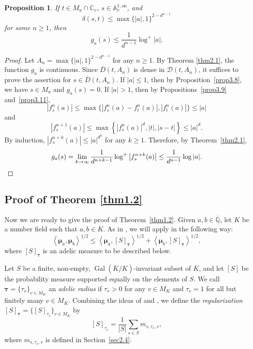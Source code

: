 \documentclass[10pt,a4paper]{amsart}
\numberwithin{equation}{section}
\theoremstyle{plain}
\newtheorem{prop}[thm]{Proposition}
\theoremstyle{definition}
\theoremstyle{remark}
\DeclareMathOperator{\Gal}{Gal}
\newcommand{\A}{\mathbb A}
\newcommand{\C}{\mathbb C}
\newcommand{\Q}{\mathbb Q}
\newcommand{\an}{\mathrm{an}}
\renewcommand{\bar}{\overline}
\begin{document}
\begin{prop}
\label{prop3.12}If $t\in M_{a}\cap\C_{v}$, $s\in\A_{v}^{1,\an}$,
and
\[
\delta(s,t)\leq\max\{|a|,1\}^{2-d^{n-1}}
\]
for some $n\geq1$, then
\[
g_{a}(s)\leq\frac{1}{d^{n-1}}\log^{+}|a|.
\]
\end{prop}

\begin{proof}
Let $A_{n}=\max\{|a|,1\}^{2-d^{n-1}}$ for any $n\geq1$. By Theorem
\ref{thm2.1}, the function $g_{a}$ is continuous. Since $\overline{D}(t,A_{n})$
is dense in $\mathcal{D}(t,A_{n})$, it suffices to prove the assertion
for $s\in\overline{D}(t,A_{n})$. If $|a|\leq1$, then by Proposition~\ref{prop3.8}, we have $s\in M_{a}$ and $g_{a}(s)=0$. If $|a|>1$, then
by Propositions~\ref{prop3.9} and~\ref{prop3.11},
\[
|f_{s}^{n}(a)|\leq\max\{|f_{s}^{n}(a)-f_{t}^{n}(a)|,|f_{t}^{n}(a)|\}\leq|a|
\]
and
\[
\left|f_{s}^{n+1}(a)\right|\leq\max\left\{|f_{s}^{n}(a)|^{d},|t|,|s-t|\right\}\leq|a|^{d}.
\]
By induction, $|f_{s}^{n+k}(a)|\leq|a|^{d^{k}}$ for any $k\geq1$.
Therefore, by Theorem~\ref{thm2.1},
\[
g_{a}(s)=\lim_{k\to\infty}\frac{1}{d^{n+k-1}}\log^{+}\left|f_{s}^{n+k}(a)\right|\leq\frac{1}{d^{n-1}}\log|a|.\qedhere
\]
\end{proof}

\subsection{Proof of Theorem \texorpdfstring{\ref{thm1.2}}{1.2}}\label{sec3.3}

Now we are ready to give the proof of Theorem~\ref{thm1.2}. Given
$a,b\in\bar{\Q}$, let $K$ be a number field such that $a,b\in K$.
As in \cite[Section 9]{DKY2}, we will apply \cite[Theorem 1]{Fi} in
the following way:
\[
\left\langle \boldsymbol{\mu}_{a},\boldsymbol{\mu}_{b}\right\rangle ^{1/2}\leq\left\langle \boldsymbol{\mu}_{a},[S]_{\boldsymbol{\tau}}\right\rangle ^{1/2}+\left\langle \boldsymbol{\mu}_{b},[S]_{\boldsymbol{\tau}}\right\rangle ^{1/2},
\]
where $[S]_{\boldsymbol{\tau}}$ is an adelic measure to be described
below.

Let $S$ be a finite, non-empty, $\Gal(\bar{K}/K)$-invariant
subset of $\bar{K}$, and let $[S]$ be the probability measure supported
equally on the elements of $S$. We call $\boldsymbol{\tau}=\{\tau_{v}\}_{v\in M_{K}}$
an \textit{adelic radius} if $\tau_{v}>0$ for any $v\in M_{K}$
and $\tau_{v}=1$ for all but finitely many $v\in M_{K}$. Combining
the ideas of \cite[Section 4.6]{FRL} and \cite[Section 2.1]{FP},
we define the \textit{regularization} $[S]_{\boldsymbol{\tau}}=\{[S]_{\tau_{v}}\}_{v\in M_{K}}$
by
\[
[S]_{\tau_{v}}=\frac{1}{|S|}\sum_{s\in S}m_{s,\tau_{v},v},
\]
where $m_{s,\tau_{v},v}$ is defined in Section~\ref{sec2.4}.
\end{document}
